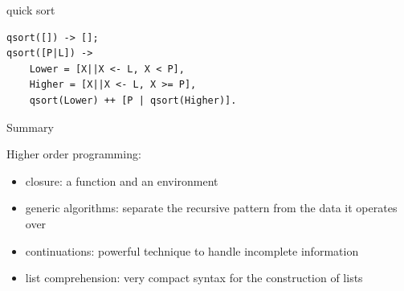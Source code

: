 \begin{frame}[fragile]{quick sort}

\begin{verbatim}
qsort([]) -> [];
qsort([P|L]) ->
    Lower = [X||X <- L, X < P],
    Higher = [X||X <- L, X >= P],
    qsort(Lower) ++ [P | qsort(Higher)].
\end{verbatim}


\end{frame}


\begin{frame}{Summary}

\pause Higher order programming:


\begin{itemize}
\pause\item {closure}: a function and an environment
\pause\item {generic algorithms}: separate the recursive pattern from the data it operates over
\pause\item {continuations}: powerful technique to handle incomplete information
\pause\item {list comprehension}: very compact syntax for the construction of lists
\end{itemize}


\end{frame}







